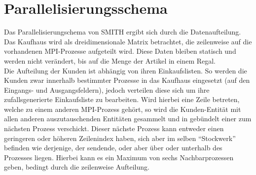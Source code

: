 \section{Parallelisierungsschema}

Das Parallelisierungschema von SMITH ergibt sich durch die Datenaufteilung.\\
Das Kaufhaus wird als dreidimensionale Matrix betrachtet, die zeilenweise auf die vorhandenen MPI-Prozesse aufgeteilt wird. Diese Daten bleiben statisch und werden nicht verändert, bis auf die Menge der Artikel in einem Regal.\\
Die Aufteilung der Kunden ist abhängig von ihren Einkaufslisten. So werden die Kunden zwar innerhalb bestimmter Prozesse in das Kaufhaus eingesetzt (auf den Eingangs- und Ausgangsfeldern), jedoch verteilen diese sich um ihre zufallsgenerierte Einkaufsliste zu bearbeiten. Wird hierbei eine Zeile betreten, welche zu einem anderen MPI-Prozess gehört, so wird die Kunden-Entität mit allen anderen auszutauschenden Entitäten gesammelt und in gebündelt einer zum nächsten Prozess verschickt. Dieser nächste Prozess kann entweder einen geringeren oder höheren Zeilenindex haben, sich aber im selben "`Stockwerk"' befinden wie derjenige, der sendende, oder aber über oder unterhalb des Prozesses liegen. Hierbei kann es ein Maximum von sechs Nachbarprozessen geben, bedingt durch die zeilenweise Aufteilung.